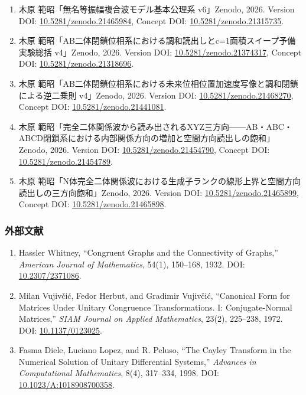 \documentclass[
  a4paper,
]{ltjsarticle}
\providecommand{\tightlist}{%
  \setlength{\itemsep}{0pt}\setlength{\parskip}{0pt}}
\begin{document}
\begin{enumerate}
\def\labelenumi{\arabic{enumi}.}
\tightlist
\item
  木原 範昭「無名等振幅複合波モデル基本公理系 v6」Zenodo, 2026. Version
  DOI:
  \href{https://doi.org/10.5281/zenodo.21465984}{10.5281/zenodo.21465984},
  Concept DOI:
  \href{https://doi.org/10.5281/zenodo.21315735}{10.5281/zenodo.21315735}.
\item
  木原
  範昭「AB二体閉鎖位相系における調和読出しとc=1面積スイープ予備実験総括
  v4」Zenodo, 2026. Version DOI:
  \href{https://doi.org/10.5281/zenodo.21374317}{10.5281/zenodo.21374317},
  Concept DOI:
  \href{https://doi.org/10.5281/zenodo.21318696}{10.5281/zenodo.21318696}.
\item
  木原
  範昭「AB二体閉鎖位相系における未来位相位置加速度写像と調和閉鎖による逆二乗則
  v4」Zenodo, 2026. Version DOI:
  \href{https://doi.org/10.5281/zenodo.21468270}{10.5281/zenodo.21468270},
  Concept DOI:
  \href{https://doi.org/10.5281/zenodo.21441081}{10.5281/zenodo.21441081}.
\item
  木原
  範昭「完全二体関係波から読み出されるXYZ三方向――AB・ABC・ABCD閉鎖系における内部関係方向の増加と空間方向読出しの飽和」Zenodo,
  2026. Version DOI:
  \href{https://doi.org/10.5281/zenodo.21454790}{10.5281/zenodo.21454790},
  Concept DOI:
  \href{https://doi.org/10.5281/zenodo.21454789}{10.5281/zenodo.21454789}.
\item
  木原
  範昭「N体完全二体関係波における生成子ランクの線形上界と空間方向読出しの三方向飽和」Zenodo,
  2026. Version DOI:
  \href{https://doi.org/10.5281/zenodo.21465899}{10.5281/zenodo.21465899},
  Concept DOI:
  \href{https://doi.org/10.5281/zenodo.21465898}{10.5281/zenodo.21465898}.
\end{enumerate}

\subsubsection{外部文献}\label{ux5916ux90e8ux6587ux732e}

\begin{enumerate}
\def\labelenumi{\arabic{enumi}.}
\setcounter{enumi}{5}
\tightlist
\item
  Hassler Whitney, ``Congruent Graphs and the Connectivity of Graphs,''
  \emph{American Journal of Mathematics}, 54(1), 150--168, 1932. DOI:
  \href{https://doi.org/10.2307/2371086}{10.2307/2371086}.
\item
  Milan Vujivčić, Fedor Herbut, and Gradimir Vujivčić, ``Canonical Form
  for Matrices Under Unitary Congruence Transformations. I:
  Conjugate-Normal Matrices,'' \emph{SIAM Journal on Applied
  Mathematics}, 23(2), 225--238, 1972. DOI:
  \href{https://doi.org/10.1137/0123025}{10.1137/0123025}.
\item
  Fasma Diele, Luciano Lopez, and R. Peluso, ``The Cayley Transform in
  the Numerical Solution of Unitary Differential Systems,''
  \emph{Advances in Computational Mathematics}, 8(4), 317--334, 1998.
  DOI:
  \href{https://doi.org/10.1023/A:1018908700358}{10.1023/A:1018908700358}.
\end{enumerate}
\end{document}
